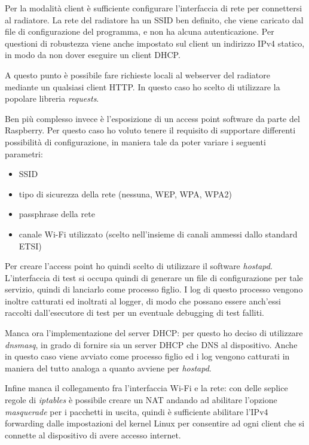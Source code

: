 \documentclass[12pt,a4paper,twoside,titlepage]{book}
\begin{document}
Per la modalità client è sufficiente configurare l'interfaccia di rete per connettersi
al radiatore. La rete del radiatore ha un SSID ben definito, che viene caricato dal
file di configurazione del programma, e non ha alcuna autenticazione. Per questioni
di robustezza viene anche impostato sul client un indirizzo IPv4 statico, in modo da
non dover eseguire un client DHCP.

A questo punto è possibile fare richieste locali al webserver del radiatore mediante
un qualsiasi client HTTP. In questo caso ho scelto di utilizzare la popolare
libreria \textit{requests}.

Ben più complesso invece è l'esposizione di un access point software da parte del
Raspberry. Per questo caso ho voluto tenere il requisito di supportare differenti
possibilità di configurazione, in maniera tale da poter variare i seguenti parametri:
\begin{itemize}
    \item SSID
    \item tipo di sicurezza della rete (nessuna, WEP, WPA, WPA2)
    \item passphrase della rete
    \item canale Wi-Fi utilizzato (scelto nell'insieme di canali ammessi dallo standard ETSI)
\end{itemize}

Per creare l'access point ho quindi scelto di utilizzare il software \textit{hostapd}.
L'interfaccia di test si occupa quindi di generare un file di configurazione per tale
servizio, quindi di lanciarlo come processo figlio. I log di questo processo vengono
inoltre catturati ed inoltrati al logger, di modo che possano essere anch'essi raccolti
dall'esecutore di test per un eventuale debugging di test falliti.

Manca ora l'implementazione del server DHCP: per questo ho deciso di utilizzare
\textit{dnsmasq}, in grado di fornire sia un server DHCP che DNS al dispositivo.
Anche in questo caso viene avviato come processo figlio ed i log vengono catturati
in maniera del tutto analoga a quanto avviene per \textit{hostapd}.

Infine manca il collegamento fra l'interfaccia Wi-Fi e la rete: con delle seplice
regole di \textit{iptables} è possibile creare un NAT andando ad abilitare l'opzione
\textit{masquerade} per i pacchetti in uscita, quindi è sufficiente abilitare l'IPv4
forwarding dalle impostazioni del kernel Linux per consentire ad ogni client che si
connette al dispositivo di avere accesso internet.
\end{document}
